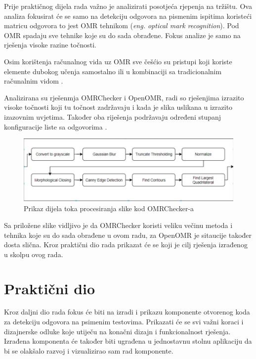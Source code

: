 \documentclass{foi}
\begin{document}
Prije praktičnog dijela rada važno je analizirati posotjeća rjepenja na tržištu. Ova analiza fokusirat će se samo na detekciju odgovora na pismenim ispitima koristeći matricu odgovora to jest OMR tehnikom (\textit{eng. optical mark recognition}). Pod OMR spadaju sve tehnike koje su do sada obrađene. Fokus analize je samo na rješenja visoke razine točnosti.

Osim korištenja računalnog vida uz OMR sve češćio su pristupi koji koriste elemente dubokog učenja samostalno ili u kombinaciji sa tradicionalnim računalnim vidom \cite{OMRComparsion}. 

Analizirana su rješenmja OMRChecker i OpenOMR, radi so rješenjima izrazito visoke točnosti koji tu točnost zadržavaju i kada je slika uslikana u izrazito izazovnim uvjetima. Također oba riješenja podržavaju određeni stupanj konfiguracije liste sa odgovorima \cite{OMRComparsion}.

\begin{figure}[H]
    \centering
    \includegraphics[width=1.0\linewidth]{slike/omr_flow.png}
    \caption{Prikaz dijela toka procesiranja slike kod OMRChecker-a \cite{OMRChecker}}
\end{figure}

Sa priložene slike vidljivo je da OMRChecker koristi veliku večinu metoda i tehnika koje su do sada obrađene u ovom radu, za OpenOMR je sitaucije također dosta slična.
Kroz praktični dio rada prikazat će se koji je cilj rješenja izrađenog u skolpu ovog rada.

\chapter{Praktični dio}

Kroz daljni dio rada fokus će biti na izradi i prikazu komponente otvorenog koda za detekciju odgovora na psimenim testovima. Prikazati će se svi važni koraci i dizajnerske odluke koje utiječu na konačni dizajn i funkcionalnost rješenja. Izrađena komponenta će također biti ugrađena u jednostavnu stolnu aplikaciju da bi se olakšalo razvoj i vizualizirao sam rad komponente. 
\end{document}
